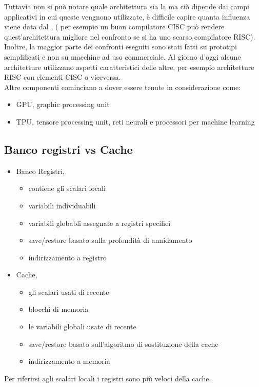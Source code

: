 \documentclass[arch.tex]{subfiles}
\begin{document}
Tuttavia non si può notare quale architettura sia la  ma ciò dipende dai campi
applicativi in cui queste vengnono utilizzate, è difficile capire quanta influenza viene
data dal , ( per esempio un buon compilatore CISC può rendere quest'architettura
migliore nel confronto se si ha uno scarso compilatore RISC). Inoltre, la maggior parte dei 
confronti eseguiti sono stati fatti su prototipi semplificati e non su macchine ad uso 
commerciale. Al giorno d'oggi alcune architetture utilizzano aspetti caratteristici delle
altre, per esempio architetture RISC con elementi CISC o viceversa.\\
Altre componenti cominciano a dover essere tenute in considerazione come:

\begin{itemize}
	\item GPU, graphic processing unit
	\item TPU, tensore processing unit, reti neurali e processori per machine learning
\end{itemize}

\subsection{Banco registri vs Cache}%
\label{sub:banco_registri_vs_cache}

\begin{itemize}
	\item Banco Registri,
		\begin{itemize}
			\item contiene  gli scalari locali
			\item variabili individuabili
			\item variabili globabli assegnate a registri specifici
			\item save/restore basato sulla profondità di annidamento
			\item indirizzamento a registro
		\end{itemize}
	\item Cache,
		\begin{itemize}
			\item {} gli scalari usati di recente
			\item blocchi di memoria
			\item {} le variabili globali usate di recente
			\item save/restore basato sull'algoritmo di sostituzione della cache
			\item indirizzamento a memoria
		\end{itemize}
\end{itemize}
Per riferirsi agli scalari locali i registri sono più veloci della cache.
\end{document}
